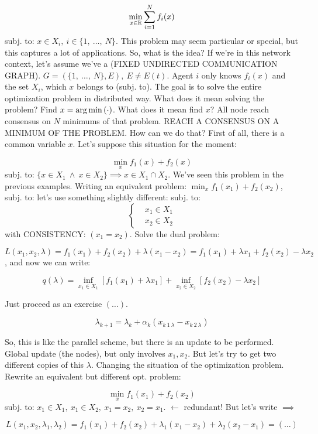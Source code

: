 \[
	\min_{x\in\mathbb{R}}{\sum_{i=1}^N{f_i(x)}}
\]
subj. to: $x\in X_i,\ i\in\{1,\ \dots,\ N\}$. This problem may seem particular or special, but this captures a lot of applications. So, what is the idea? If we're in this network context, let's assume we've a (FIXED UNDIRECTED COMMUNICATION GRAPH). $G=(\{1,\ \dots,\ N\}, E),\ E\neq E(t)$. Agent $i$ only knows $f_i(x)$ and the set $X_i$, which $x$ belongs to (subj. to). The goal is to solve the entire optimization problem in distributed way. What does it mean solving the problem? Find $x=\operatorname*{arg\,min}{(\mathord{\cdot})}$. What does it mean find $x$? All node reach consensus on $N$ minimums of that problem. REACH A CONSENSUS ON A MINIMUM OF THE PROBLEM. How can we do that? First of all, there is a common variable $x$. Let's suppose this situation for the moment:

\[
	\min_x{f_1(x) + f_2(x)}
\]
subj. to: $\{x\in X_1\ \land\ x\in X_2\} \implies x\in X_1 \cap X_2$. We've seen this problem in the previous examples. Writing an equivalent problem: $\min_x{f_1(x_1)+f_2(x_2)}$, subj. to: let's use something slightly different: subj. to:
\[
	\left\{
	\begin{aligned}
	&x_1\in X_1\\
	&x_2\in X_2
	\end{aligned}
	\right.
\]
with CONSISTENCY: $(x_1=x_2)$. Solve the dual problem:

\[
	L(x_1,x_2,\lambda) = f_1(x_1) + f_2(x_2) + \lambda(x_1-x_2) = f_1(x_1) + \lambda x_1 + f_2(x_2) - \lambda x_2
\]
, and now we can write:

\[
	q(\lambda) = \inf_{x_1\in X_1}{[f_1(x_1) + \lambda x_1]} + \inf_{x_2\in X_2}{[f_2(x_2) - \lambda x_2]}
\]

Just proceed as an exercise $(\dots)$.

\[	
	\lambda_{k+1} = \lambda_k +\alpha_k(x_{k\ 1\ \lambda} - x_{k\ 2\ \lambda})
\]

So, this is like the parallel scheme, but there is an update to be performed. Global update (the nodes), but only involves $x_1,x_2$. But let's try to get two different copies of this $\lambda$. Changing the situation of the optimization problem. Rewrite an equivalent but different opt. problem:

\[
	\min_x{f_1(x_1) + f_2(x_2)}
\]
subj. to: $x_1\in X_1,\ x_1\in X_2,\ x_1=x_2,\ x_2=x_1$. $\leftarrow$ redundant! But let's write $\implies$

\[
	L(x_1,x_2,\lambda_1,\lambda_2) = f_1(x_1) + f_2(x_2) + \lambda_1(x_1-x_2) + \lambda_2(x_2-x_1) = (\dots)
\]

